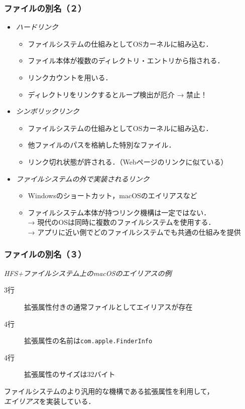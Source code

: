 \documentclass[handout]{beamer}                   %
\begin{document}
\begin{frame}
  \frametitle{ファイルの別名（２）}
  \begin{itemize}
  \item \emph{ハードリンク} \\
    \begin{itemize}
    \item ファイルシステムの仕組みとしてOSカーネルに組み込む．
    \item ファイル本体が複数のディレクトリ・エントリから指される．
    \item リンクカウントを用いる．
    \item ディレクトリをリンクするとループ検出が厄介 → 禁止！
    \end{itemize}
  \item \emph{シンボリックリンク} \\
    \begin{itemize}
    \item ファイルシステムの仕組みとしてOSカーネルに組み込む．
    \item 他ファイルのパスを格納した特別なファイル．
    \item リンク切れ状態が許される．（Webページのリンクに似ている）
    \end{itemize}
  \item \emph{ファイルシステムの外で実装されるリンク} \\
    \begin{itemize}
    \item Windowsのショートカット，macOSのエイリアスなど
    \item ファイルシステム本体が持つリンク機構は一定ではない． \\
      → 現代のOSは同時に複数のファイルシステムを使用する．\\
      → アプリに近い側でどのファイルシステムでも共通の仕組みを提供
    \end{itemize}
  \end{itemize}
\end{frame}

\begin{frame}
  \frametitle{ファイルの別名（３）}
  \emph{HFS+ファイルシステム上のmacOSのエイリアスの例}
  \begin{description}
    \item[3行] 拡張属性付きの通常ファイルとしてエイリアスが存在
    \item[4行] 拡張属性の名前は\texttt{com.apple.FinderInfo}
    \item[4行] 拡張属性のサイズは32バイト
  \end{description}
  ファイルシステムのより汎用的な機構である拡張属性を利用して，\\
  \emph{エイリアス}を実装している．
  \vfill
\end{frame}
\end{document}
